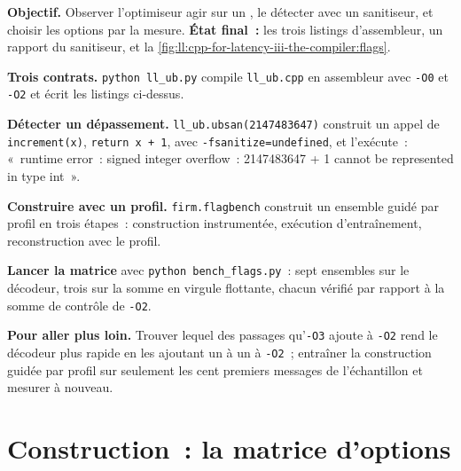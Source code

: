 \begin{tutorial}
\textbf{Objectif.} Observer l'optimiseur agir sur un , le détecter avec un sanitiseur, et choisir les options par la mesure.
\textbf{État final~:} les trois listings d'assembleur, un rapport du sanitiseur, et
la \cref{fig:ll:cpp-for-latency-iii-the-compiler:flags}.
\begin{tutsteps}
\item \textbf{Trois contrats.} \texttt{python ll\_ub.py} compile \texttt{ll\_ub.cpp} en assembleur avec \texttt{-O0} et
\texttt{-O2} et écrit les listings ci-dessus.
\item \textbf{Détecter un dépassement.} \texttt{ll\_ub.ubsan(2147483647)} construit un appel de \texttt{increment(x)},
\texttt{return x + 1}, avec \texttt{-fsanitize=undefined}, et l'exécute~: «~runtime error~: signed integer overflow~: 2147483647 + 1 cannot
be represented in type int~».
\item \textbf{Construire avec un profil.} \texttt{firm.flagbench} construit un ensemble guidé par profil en trois étapes~: construction
instrumentée, exécution d'entraînement, reconstruction avec le profil.
\label{lst:ll:cpp-for-latency-iii-the-compiler:build}
\item \textbf{Lancer la matrice} avec \texttt{python bench\_flags.py}~: sept ensembles sur le décodeur, trois sur la somme en virgule flottante, chacun
vérifié par rapport à la somme de contrôle de \texttt{-O2}.
\end{tutsteps}
\textbf{Pour aller plus loin.} Trouver lequel des passages qu'\texttt{-O3} ajoute à \texttt{-O2} rend le décodeur plus rapide
en les ajoutant un à un à \texttt{-O2}~; entraîner la construction guidée par profil sur seulement les cent premiers messages de l'échantillon
et mesurer à nouveau.
\end{tutorial}

\section{Construction~: la matrice d'options}\label{bld:ll:cpp-for-latency-iii-the-compiler:flagbench}

